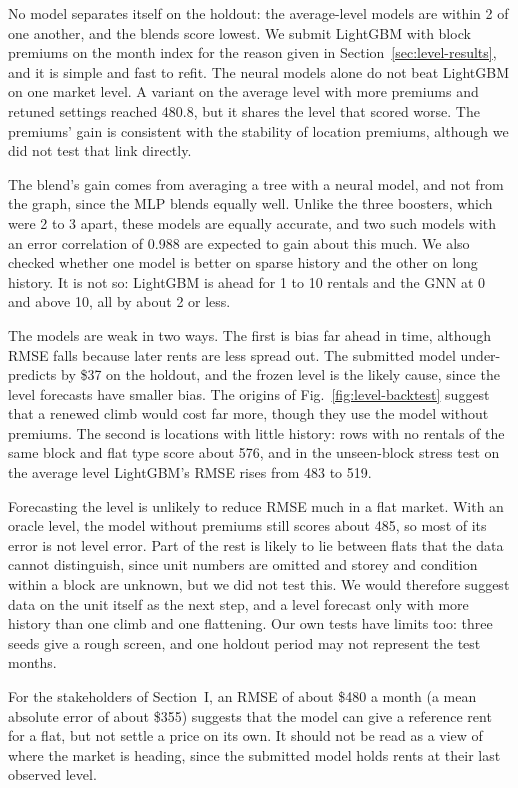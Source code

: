 No model separates itself on the holdout: the average-level models are within 2 of one another, and the blends score lowest. We submit LightGBM with block premiums on the month index for the reason given in Section~\ref{sec:level-results}, and it is simple and fast to refit. The neural models alone do not beat LightGBM on one market level. A variant on the average level with more premiums and retuned settings reached 480.8, but it shares the level that scored worse. The premiums' gain is consistent with the stability of location premiums, although we did not test that link directly.

The blend's gain comes from averaging a tree with a neural model, and not from the graph, since the MLP blends equally well. Unlike the three boosters, which were 2 to 3 apart, these models are equally accurate, and two such models with an error correlation of 0.988 are expected to gain about this much. We also checked whether one model is better on sparse history and the other on long history. It is not so: LightGBM is ahead for 1 to 10 rentals and the GNN at 0 and above 10, all by about 2 or less.

The models are weak in two ways. The first is bias far ahead in time, although RMSE falls because later rents are less spread out. The submitted model under-predicts by \$37 on the holdout, and the frozen level is the likely cause, since the level forecasts have smaller bias. The origins of Fig.~\ref{fig:level-backtest} suggest that a renewed climb would cost far more, though they use the model without premiums. The second is locations with little history: rows with no rentals of the same block and flat type score about 576, and in the unseen-block stress test on the average level LightGBM's RMSE rises from 483 to 519.

Forecasting the level is unlikely to reduce RMSE much in a flat market. With an oracle level, the model without premiums still scores about 485, so most of its error is not level error. Part of the rest is likely to lie between flats that the data cannot distinguish, since unit numbers are omitted and storey and condition within a block are unknown, but we did not test this. We would therefore suggest data on the unit itself as the next step, and a level forecast only with more history than one climb and one flattening. Our own tests have limits too: three seeds give a rough screen, and one holdout period may not represent the test months.

For the stakeholders of Section~I, an RMSE of about \$480 a month (a mean absolute error of about \$355) suggests that the model can give a reference rent for a flat, but not settle a price on its own. It should not be read as a view of where the market is heading, since the submitted model holds rents at their last observed level.

